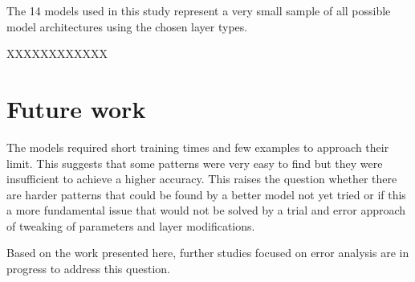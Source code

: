 The 14 models used in this study represent a very small sample of all possible model architectures using the chosen layer types. 

XXXXXXXXXXXX

\section{Future work}
The models required short training times and few examples to approach their limit.
This suggests that some patterns were very easy to find but they were insufficient to achieve a higher accuracy.
This raises the question whether there are harder patterns that could be found by a better model not yet tried or if this a more fundamental issue that would not be solved by a trial and error approach of tweaking of parameters and layer modifications.

Based on the work presented here, further studies focused on error analysis are in progress to address this question.